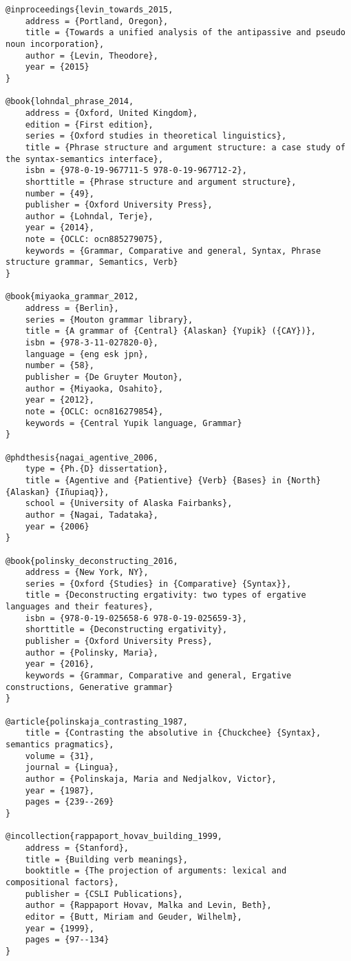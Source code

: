 \documentclass[output=paper,modfonts,nonflat]{langsci/langscibook}
\begin{document}
\begin{verbatim}
@inproceedings{levin_towards_2015,
	address = {Portland, Oregon},
	title = {Towards a unified analysis of the antipassive and pseudo noun incorporation},
	author = {Levin, Theodore},
	year = {2015}
}

@book{lohndal_phrase_2014,
	address = {Oxford, United Kingdom},
	edition = {First edition},
	series = {Oxford studies in theoretical linguistics},
	title = {Phrase structure and argument structure: a case study of the syntax-semantics interface},
	isbn = {978-0-19-967711-5 978-0-19-967712-2},
	shorttitle = {Phrase structure and argument structure},
	number = {49},
	publisher = {Oxford University Press},
	author = {Lohndal, Terje},
	year = {2014},
	note = {OCLC: ocn885279075},
	keywords = {Grammar, Comparative and general, Syntax, Phrase structure grammar, Semantics, Verb}
}

@book{miyaoka_grammar_2012,
	address = {Berlin},
	series = {Mouton grammar library},
	title = {A grammar of {Central} {Alaskan} {Yupik} ({CAY})},
	isbn = {978-3-11-027820-0},
	language = {eng esk jpn},
	number = {58},
	publisher = {De Gruyter Mouton},
	author = {Miyaoka, Osahito},
	year = {2012},
	note = {OCLC: ocn816279854},
	keywords = {Central Yupik language, Grammar}
}

@phdthesis{nagai_agentive_2006,
	type = {Ph.{D} dissertation},
	title = {Agentive and {Patientive} {Verb} {Bases} in {North} {Alaskan} {Iñupiaq}},
	school = {University of Alaska Fairbanks},
	author = {Nagai, Tadataka},
	year = {2006}
}

@book{polinsky_deconstructing_2016,
	address = {New York, NY},
	series = {Oxford {Studies} in {Comparative} {Syntax}},
	title = {Deconstructing ergativity: two types of ergative languages and their features},
	isbn = {978-0-19-025658-6 978-0-19-025659-3},
	shorttitle = {Deconstructing ergativity},
	publisher = {Oxford University Press},
	author = {Polinsky, Maria},
	year = {2016},
	keywords = {Grammar, Comparative and general, Ergative constructions, Generative grammar}
}

@article{polinskaja_contrasting_1987,
	title = {Contrasting the absolutive in {Chuckchee} {Syntax}, semantics pragmatics},
	volume = {31},
	journal = {Lingua},
	author = {Polinskaja, Maria and Nedjalkov, Victor},
	year = {1987},
	pages = {239--269}
}

@incollection{rappaport_hovav_building_1999,
	address = {Stanford},
	title = {Building verb meanings},
	booktitle = {The projection of arguments: lexical and compositional factors},
	publisher = {CSLI Publications},
	author = {Rappaport Hovav, Malka and Levin, Beth},
	editor = {Butt, Miriam and Geuder, Wilhelm},
	year = {1999},
	pages = {97--134}
}


\end{verbatim}
\end{document}
